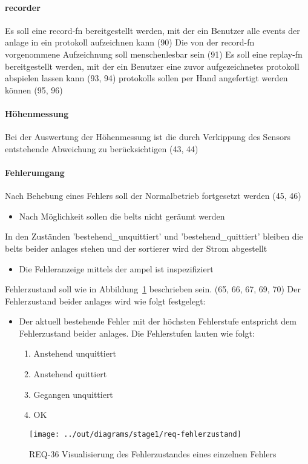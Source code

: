 \paragraph{\gls{recorder}}
\begin{itemize}
     Es soll eine \gls{record-fn} bereitgestellt werden, mit der ein Benutzer alle
    \glspl{event} der \gls{anlage} in ein \gls{protokoll} aufzeichnen kann (90)
     Die von der \gls{record-fn} vorgenommene Aufzeichnung soll menschenlesbar sein (91)
     Es soll eine \gls{replay-fn} bereitgestellt werden, mit der ein
    Benutzer eine zuvor aufgezeichnetes \gls{protokoll} abspielen lassen kann (93, 94)
     \glspl{protokoll} sollen per Hand angefertigt werden können (95, 96)
\end{itemize}

\paragraph{Höhenmessung}
\begin{itemize}
     Bei der Auswertung der Höhenmessung ist die durch Verkippung des Sensors entstehende Abweichung zu berücksichtigen (43, 44)
\end{itemize}

\paragraph{Fehlerumgang}
\begin{itemize}
     Nach Behebung eines Fehlers soll der Normalbetrieb fortgesetzt werden (45, 46)
    \begin{itemize}
        \item Nach Möglichkeit sollen die \glspl{belt} nicht geräumt werden
    \end{itemize}
     In den Zuständen 'bestehend\_unquittiert' und 'bestehend\_quittiert' bleiben die
    \glspl{belt} beider \glspl{anlage} stehen und der \gls{sortierer} wird der Strom abgestellt
    \begin{itemize}
        \item Die Fehleranzeige mittels der \gls{ampel} ist inspezifiziert
    \end{itemize}
     Fehlerzustand soll wie in Abbildung~\ref{fig:stm-fehlerzustand} beschrieben sein. (65, 66, 67, 69, 70)
     Der Fehlerzustand beider \glspl{anlage} wird wie folgt festgelegt:
    \begin{itemize}
        \item Der aktuell bestehende Fehler mit der höchsten Fehlerstufe entspricht dem Fehlerzustand beider \glspl{anlage}.
        Die Fehlerstufen lauten wie folgt:
    \begin{enumerate}
        \item Anstehend unquittiert
        \item Anstehend quittiert
        \item Gegangen unquittiert
        \item OK
    \end{enumerate}
    \end{itemize}
\end{itemize}

\begin{figure}[h]
    \centering
    \texttt{[image: ../out/diagrams/stage1/req-fehlerzustand]}
    \caption{REQ-36 Visualisierung des Fehlerzustandes eines einzelnen Fehlers}
    \label{fig:stm-fehlerzustand}
\end{figure}
